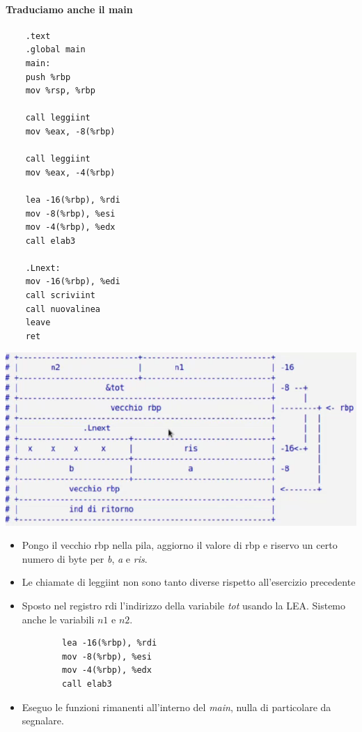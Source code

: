 \paragraph{Traduciamo anche il main}
\begin{verbatim}
	.text
	.global main
	main:
	push %rbp
	mov %rsp, %rbp
	
	call leggiint
	mov %eax, -8(%rbp)
	
	call leggiint
	mov %eax, -4(%rbp)   
	
	lea -16(%rbp), %rdi
	mov -8(%rbp), %esi
	mov -4(%rbp), %edx
	call elab3
	
	.Lnext:     
	mov -16(%rbp), %edi
	call scriviint
	call nuovalinea
	leave 
	ret
\end{verbatim}
\begin{center}
	\includegraphics{img/36.PNG}
\end{center}
\begin{itemize}
	\item Pongo il vecchio rbp nella pila, aggiorno il valore di rbp e riservo un certo numero di byte per \emph{b}, \emph{a} e \emph{ris}.
	\item Le chiamate di leggiint non sono tanto diverse rispetto all'esercizio precedente
	\item Sposto nel registro rdi l'indirizzo della variabile \emph{tot} usando la LEA. Sistemo anche le variabili $n1$ e $n2$.
	\begin{verbatim}
		lea -16(%rbp), %rdi 
		mov -8(%rbp), %esi
		mov -4(%rbp), %edx
		call elab3
	\end{verbatim}
	\item Eseguo le funzioni rimanenti all'interno del \emph{main}, nulla di particolare da segnalare.
\end{itemize}
